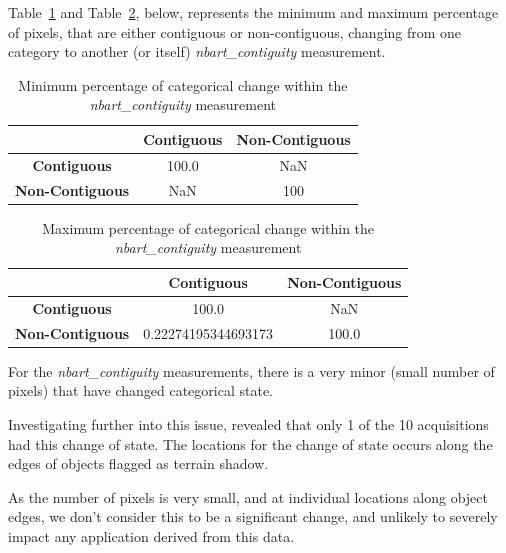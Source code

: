 \documentclass[a4paper]{article}
\begin{document}

    \begin{flushleft}
      Table~\ref{table:7} and Table~\ref{table:8}, below, represents the minimum and maximum percentage of pixels, that are either contiguous or non-contiguous, changing from one category to another (or itself) \textit{nbart\_contiguity} measurement.
    \end{flushleft}

    \begin{table}[ht!]
      \caption{Minimum percentage of categorical change within the \textit{nbart\_contiguity} measurement}\label{table:7}
      \centering
      \begin{tabular}{ccc} \midrule
        & \textbf{Contiguous} & \textbf{Non-Contiguous} \\ \midrule
        \textbf{Contiguous} & 100.0 & NaN \\
        \textbf{Non-Contiguous} & NaN & 100 \\
      \end{tabular}
    \end{table}

    \begin{table}[ht!]
      \caption{Maximum percentage of categorical change within the \textit{nbart\_contiguity} measurement}\label{table:8}
      \centering
      \begin{tabular}{ccc} \midrule
        & \textbf{Contiguous} & \textbf{Non-Contiguous} \\ \midrule
        \textbf{Contiguous} & 100.0 & NaN \\
        \textbf{Non-Contiguous} & 0.22274195344693173 & 100.0 \\
      \end{tabular}
    \end{table}

    \begin{flushleft}
      For the \textit{nbart\_contiguity} measurements, there is a very minor (small number of pixels) that have changed categorical state. \par
      Investigating further into this issue, revealed that only 1 of the 10 acquisitions had this change of state. The locations for the change of state occurs along the edges of objects flagged as terrain shadow. \par
      As the number of pixels is very small, and at individual locations along object edges, we don't consider this to be a significant change, and unlikely to severely impact any application derived from this data.
    \end{flushleft}
\end{document}
